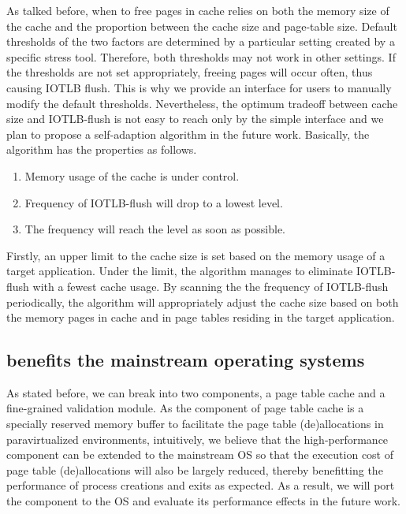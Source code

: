 As talked before, when to free pages in cache relies on both the memory size of the cache and the proportion between the cache size and page-table size. Default thresholds of the two factors are determined by a particular setting created by a specific stress tool. Therefore, both thresholds may not work in other settings. If the thresholds are not set appropriately, freeing pages will occur often, thus causing IOTLB flush. This is why we provide an interface for users to manually modify the default thresholds. Nevertheless, the optimum tradeoff between cache size and IOTLB-flush is not easy to reach only by the simple interface and we plan to propose a self-adaption algorithm in the future work. Basically, the algorithm has the properties as follows.
\begin{enumerate}
\item Memory usage of the cache is under control.
\item Frequency of IOTLB-flush will drop to a lowest level.
\item The frequency will reach the level as soon as possible.
\end{enumerate}

Firstly, an upper limit to the cache size is set based on the memory usage of a target application. Under the limit, the algorithm manages to eliminate IOTLB-flush with a fewest cache usage. By scanning the the frequency of IOTLB-flush periodically, the algorithm will appropriately adjust the cache size based on both the memory pages in cache and in page tables residing in the target application.



\subsection{\name benefits the mainstream operating systems}

As stated before, we can break \name into two components, a page table cache and a fine-grained validation module. As the component of page table cache is a specially reserved memory buffer to facilitate the page table (de)allocations in paravirtualized environments, intuitively, we believe that the high-performance component can be extended to the mainstream OS so that the execution cost of page table (de)allocations will also be largely reduced, thereby benefitting the performance of process creations and exits as expected. As a result, we will port the component to the OS and evaluate its performance effects in the future work.

